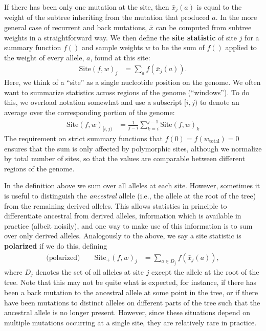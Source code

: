 \documentclass[9pt,twoside,lineno]{gsajnl}
\newcommand{\site}{\mbox{Site}} %
\newcommand{\sitep}{\mbox{Site}_+} %
\newcommand{\iw}{w} %
\newcommand{\tiw}{w_\text{total}} %
\newcommand{\aw}{{\bar x}} %
\begin{document}
If there has been only one mutation at the site,
then $\aw_j(a)$ is equal to the weight of the subtree inheriting from the mutation that produced $a$.
In the more general case of recurrent and back mutations, $\aw$ can
be computed from subtree weights in a straightforward way.
We then define the \textbf{site statistic} of site $j$ for a summary function $f()$
and sample weights $\iw$ to be the sum of $f()$
applied to the weight of every allele, $a$, found at this site:
\begin{align}
    \site(f, \iw)_j
    &=
    \sum_{a} f(\aw_j(a)).
\end{align}
Here, we think of a ``site'' as a single nucleotide position on the genome.
We often want to summarize statistics across regions of the genome (``windows'').
To do this, we overload notation somewhat and use a subscript $[i,j)$ to denote an average
over the corresponding portion of the genome:
\begin{align}
    \site(f, \iw)_{[i,j)}
    &=
    \frac{1}{j-i} \sum_{k=i}^{j-1} \site(f, \iw)_k
\end{align}
The requirement on strict summary functions that $f(0) = f(\tiw) = 0$
ensures that the sum is only affected by polymorphic sites,
although we normalize by total number of sites,
so that the values are comparable between different regions of the genome.


In the definition above we sum over all alleles at each site.
However, sometimes it is useful to distinguish the \emph{ancestral} allele
(i.e., the allele at the root of the tree) from the remaining derived alleles.
This allows statistics in principle to differentiate ancestral from derived alleles,
information which is available in practice (albeit noisily),
and one way to make use of this information is to sum over only derived alleles.
Analogously to the above,
we say a site statistic is \textbf{polarized} if we do this,
defining
\begin{align} \label{eqn:site_polarised}
    \text{(polarized)} \qquad
    \sitep(f, \iw)_j
    &=
    \sum_{a \in D_j} f(\aw_j(a)) ,
\end{align}
where $D_j$ denotes the set of all alleles at site $j$ except the allele at the root of the tree.
Note that this may not be quite what is expected,
for instance, if there has been a back mutation to the ancestral allele at some point in the tree,
or if there have been mutations to distinct alleles on different parts of the tree
such that the ancestral allele is no longer present.
However, since these situations depend on multiple mutations occurring at a single site,
they are relatively rare in practice.
\end{document}
